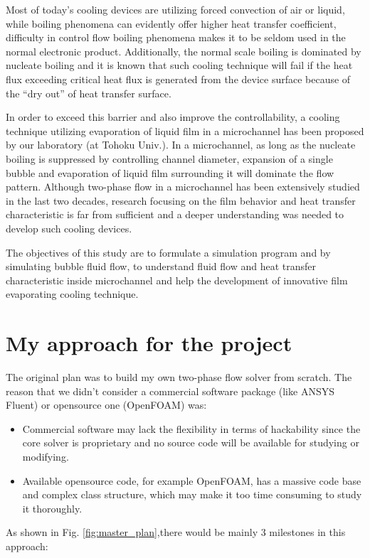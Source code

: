 \documentclass[a4,14pt]{extarticle}
\begin{document}
Most of today’s cooling devices are utilizing forced convection of air or liquid,
while boiling phenomena can evidently offer higher heat transfer coefficient, difficulty
in control flow boiling phenomena makes it to be seldom used in the normal electronic
product. Additionally, the normal scale boiling is dominated by nucleate boiling and
it is known that such cooling technique will fail if the heat flux exceeding critical
heat flux is generated from the device surface because of the “dry out” of heat transfer
surface.

In order to exceed this barrier and also improve the controllability, a cooling
technique utilizing evaporation of liquid film in a microchannel has been proposed by our
laboratory (at Tohoku Univ.). In a microchannel, as long as the nucleate boiling is
suppressed by controlling channel diameter, expansion of a single bubble and evaporation
of liquid film surrounding it will dominate the flow pattern.
Although two-phase flow in a microchannel has been
extensively studied in the last two decades, research focusing on the film behavior and
heat transfer characteristic is far from sufficient and a deeper understanding was needed
to develop such cooling devices.

The objectives of this study are to formulate a simulation
program and by simulating bubble fluid flow, to understand fluid flow and heat transfer
characteristic inside microchannel and help the development of innovative film evaporating
cooling technique.

\section{My approach for the project}

The original plan was to build my own two-phase flow solver from scratch.
The reason that we didn't consider a commercial software package (like ANSYS Fluent) or
opensource one (OpenFOAM) was:
\begin{itemize}
\item{Commercial software may lack the flexibility in terms of hackability since the core solver is
proprietary and no source code will be available for studying or modifying.}
\item{Available opensource code, for example OpenFOAM, has a massive code base and complex
class structure, which may make it too time consuming to study it thoroughly.}
\end{itemize}

As shown in Fig. \ref{fig:master_plan},there would be mainly 3 milestones in this approach:
\end{document}
